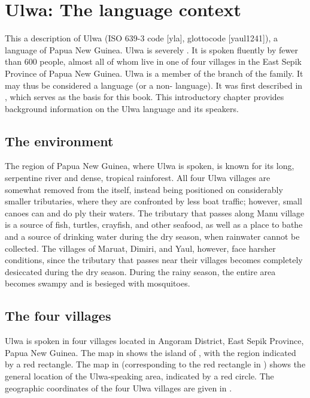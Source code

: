 \chapter{Ulwa: The language context}\label{sec:1}

This a description of Ulwa (ISO 639-3 code [yla], glottocode [yaul1241]), a language of Papua New Guinea. Ulwa is severely . It is spoken fluently by fewer than 600 people, almost all of whom live in one of four villages in the East Sepik Province of Papua New Guinea. Ulwa is a member of the  branch of the  family. It may thus be considered a  language (or a non- language). It was first described in \citet{Barlow2018a}, which serves as the basis for this book. This introductory chapter provides background information on the Ulwa language and its speakers.

\section{The environment}\label{sec:1.5.2}

The  region of Papua New Guinea, where Ulwa is spoken, is known for its long, serpentine river and dense, tropical rainforest. All four Ulwa villages are somewhat removed from the  itself, instead being positioned on considerably smaller tributaries, where they are confronted by less boat traffic; however, small canoes can and do ply their waters. The  tributary that passes along Manu village is a source of fish, turtles, crayfish, and other seafood, as well as a place to bathe and a source of drinking water during the dry season, when rainwater cannot be collected. The villages of Maruat, Dimiri, and Yaul, however, face harsher conditions, since the  tributary that passes near their villages becomes completely desiccated during the dry season. During the rainy season, the entire area becomes swampy and is besieged with mosquitoes.

\section{The four villages}\label{sec:1.5.3}

Ulwa is spoken in four villages located in Angoram District, East Sepik Province, Papua New Guinea. The map in  shows the island of , with the  region indicated by a red rectangle. The map in  (corresponding to the red rectangle in ) shows the general location of the Ulwa-speaking area, indicated by a red circle. The geographic coordinates of the four Ulwa villages are given in .

